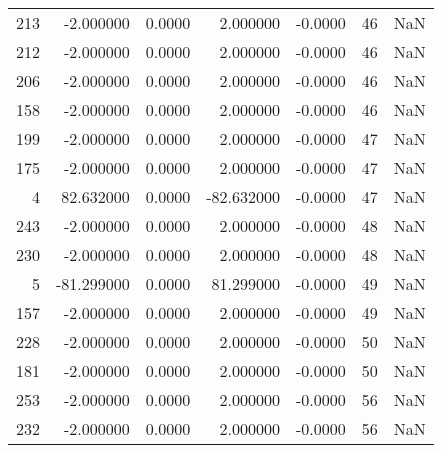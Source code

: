 \begin{tabular}{rrrrrrr}
213 &  -2.000000 &    0.0000 &   2.000000 &     -0.0000 &          46 & NaN \\
212 &  -2.000000 &    0.0000 &   2.000000 &     -0.0000 &          46 & NaN \\
206 &  -2.000000 &    0.0000 &   2.000000 &     -0.0000 &          46 & NaN \\
158 &  -2.000000 &    0.0000 &   2.000000 &     -0.0000 &          46 & NaN \\
199 &  -2.000000 &    0.0000 &   2.000000 &     -0.0000 &          47 & NaN \\
175 &  -2.000000 &    0.0000 &   2.000000 &     -0.0000 &          47 & NaN \\
  4 &  82.632000 &    0.0000 & -82.632000 &     -0.0000 &          47 & NaN \\
243 &  -2.000000 &    0.0000 &   2.000000 &     -0.0000 &          48 & NaN \\
230 &  -2.000000 &    0.0000 &   2.000000 &     -0.0000 &          48 & NaN \\
  5 & -81.299000 &    0.0000 &  81.299000 &     -0.0000 &          49 & NaN \\
157 &  -2.000000 &    0.0000 &   2.000000 &     -0.0000 &          49 & NaN \\
228 &  -2.000000 &    0.0000 &   2.000000 &     -0.0000 &          50 & NaN \\
181 &  -2.000000 &    0.0000 &   2.000000 &     -0.0000 &          50 & NaN \\
253 &  -2.000000 &    0.0000 &   2.000000 &     -0.0000 &          56 & NaN \\
232 &  -2.000000 &    0.0000 &   2.000000 &     -0.0000 &          56 & NaN \\
\bottomrule
\end{tabular}
